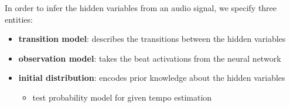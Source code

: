 \documentclass{scrartcl}
\begin{document}
\vspace{1em}
In order to infer the hidden variables from an audio signal, we specify three entities:

\begin{itemize}
\item \textbf{transition model}: describes the transitions between the hidden variables 
\item \textbf{observation model}: takes the beat activations from the neural network
\item \textbf{initial distribution}: encodes prior knowledge about the hidden variables
\begin{itemize}
\item test probability model for given tempo estimation 
\end{itemize}
\end{itemize}
\end{document}
